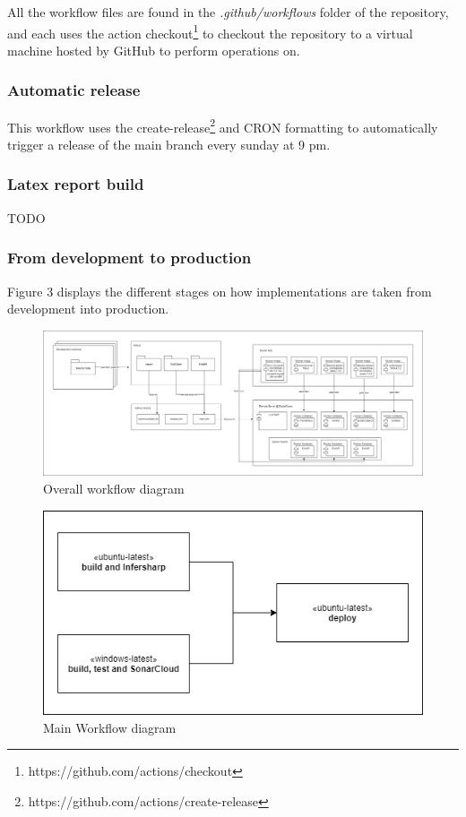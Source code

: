 \documentclass[report/main.tex]{subfiles}
\begin{document}
        All the workflow files are found in the \textit{.github/workflows} folder of the repository, and each uses the action checkout\footnote{https://github.com/actions/checkout} to checkout the repository to a virtual machine hosted by GitHub to perform operations on. 
        
        \subsubsection{Automatic release}
        
        This workflow uses the create-release\footnote{https://github.com/actions/create-release} and CRON formatting to automatically trigger a release of the main branch every sunday at 9 pm. 
        
        \subsubsection{Latex report build}
        
        TODO
        
        
        \subsubsection{From development to production}
        
        Figure 3 displays the different stages on how implementations are taken from development into production. 
        
        \begin{figure}[H]
            \centering
                \includegraphics[width=\textwidth]{report/images/MiniTwit-workflow-final.png}
                \caption{Overall workflow diagram}
            \label{fig:overall_workflow}
        \end{figure}
        
        
        \begin{figure}[H]
            \centering
                \includegraphics[width=\textwidth/2]{report/images/MiniTwit-main-final.png}
                \caption{Main Workflow diagram}
            \label{fig:main_workflow}
        \end{figure}
            
\end{document}
